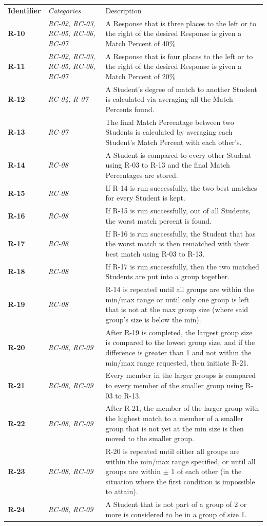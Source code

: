 \documentclass[12pt,letterpaper]{article}
\begin{document}
\begin{center}
    \begin{tabu} to 
	    \tableheader{}Identifier & Categories & Description\\
		
		R-10 & RC-02, RC-03, RC-05, RC-06, RC-07 & A Response that is three places to the left or to the right of the desired Response is given a Match Percent of 40\%\\
		R-11 & RC-02, RC-03, RC-05, RC-06, RC-07 & A Response that is four places to the left or to the right of the desired Response is given a Match Percent of 20\%\\
		R-12 & RC-04, R-07 & A Student's degree of match to another Student is calculated via averaging all the Match Percents found. \\
		R-13 & RC-07 & The final Match Percentage between two Students is calculated by averaging each Student's Match Percent with each other's.\\
		R-14 & RC-08 & A Student is compared to every other Student using R-03 to R-13 and the final Match Percentages are stored.\\
		R-15 & RC-08 & If R-14 is run successfully, the two best matches for every Student is kept.\\
		R-16 & RC-08 & If R-15 is run successfully, out of all Students, the worst match percent is found.\\
		R-17 & RC-08 & If R-16 is run successfully, the Student that has the worst match is then rematched with their best match using R-03 to R-13.\\
		R-18 & RC-08 & If R-17 is run successfully, then the two matched Students are put into a group together.\\
		R-19 & RC-08 & R-14 is repeated until all groups are within the min/max range or until only one group is left that is not at the max group size (where said group's size is below the min).\\
		R-20 & RC-08, RC-09 & After R-19 is completed, the largest group size is compared to the lowest group size, and if the difference is greater than 1 and not within the min/max range requested, then initiate R-21.\\
		R-21 & RC-08, RC-09 & Every member in the larger groups is compared to every member of the smaller group using R-03 to R-13. \\
		R-22 & RC-08, RC-09 & After R-21, the member of the larger group with the highest match to a member of a smaller group that is not yet at the min size is then moved to the smaller group.\\
		R-23 & RC-08, RC-09 & R-20 is repeated until either all groups are within the min/max range specified, or until all groups are within $\pm$ 1 of each other (in the situation where the first condition is impossible to attain).\\
		R-24 & RC-08, RC-09 & A Student that is not part of a group of 2 or more is considered to be in a group of size 1.
    \end{tabu}
\end{center}
\end{document}
